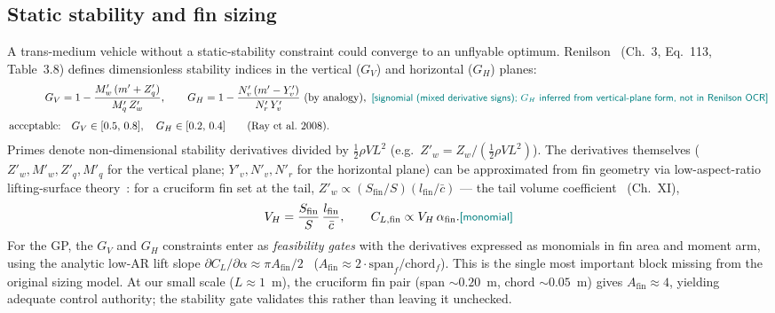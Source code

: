 \documentclass{new-aiaa}
\newcommand{\gpc}[1]{\textcolor{teal}{\small\textsf{[#1]}}} %
\begin{document}
\subsection{Static stability and fin sizing}\label{sec:stability}
A trans-medium vehicle without a static-stability constraint could converge to an unflyable optimum.
Renilson~\cite{renilson2018submarine} (Ch.~3, Eq.~113, Table~3.8) defines dimensionless stability
indices in the vertical ($G_V$) and horizontal ($G_H$) planes:
\begin{align}
G_V &= 1 - \frac{M'_w\,(m' + Z'_q)}{M'_q\,Z'_w},
\qquad
G_H = 1 - \frac{N'_v\,(m' - Y'_v)}{N'_r\,Y'_v}\ \text{(by analogy)},\ \gpc{signomial (mixed derivative signs); $G_H$ inferred from vertical-plane form, not in Renilson OCR}\\[4pt]
\text{acceptable:}&\quad G_V\in[0.5,\,0.8],\quad G_H\in[0.2,\,0.4] \qquad\text{(Ray~et~al.~2008)}.
\end{align}
Primes denote non-dimensional stability derivatives divided by $\frac12\rho V L^2$ (e.g.\
$Z'_w = Z_w/(\frac12\rho V L^2)$). The derivatives themselves ($Z'_w, M'_w, Z'_q, M'_q$ for the
vertical plane; $Y'_v, N'_v, N'_r$ for the horizontal plane) can be approximated from fin geometry
via low-aspect-ratio lifting-surface theory~\cite{hoerner1985fluid}: for a cruciform fin set at the
tail, $Z'_w \propto (S_{\text{fin}}/S)(l_{\text{fin}}/\bar{c})$ — the tail volume
coefficient~\cite{hoerner1985fluid} (Ch.~XI),
\begin{equation}
V_H = \frac{S_{\text{fin}}}{S}\,\frac{l_{\text{fin}}}{\bar{c}},
\qquad
C_{L,\text{fin}} \propto V_H\,\alpha_{\text{fin}}. \gpc{monomial}
\end{equation}
For the GP, the $G_V$ and $G_H$ constraints enter as \emph{feasibility gates} with the derivatives
expressed as monomials in fin area and moment arm, using the analytic low-AR lift slope
$\partial C_L/\partial\alpha \approx \pi A_{\text{fin}}/2$~\cite{hoerner1985fluid} ($A_{\text{fin}}
\approx 2\cdot\text{span}_f/\text{chord}_f$). This is the single most important block missing from
the original sizing model. At our small scale ($L\approx1$~m), the cruciform fin pair
(span $\sim\!0.20$~m, chord $\sim\!0.05$~m) gives $A_{\text{fin}}\approx4$, yielding adequate
control authority; the stability gate validates this rather than leaving it unchecked.
\end{document}
